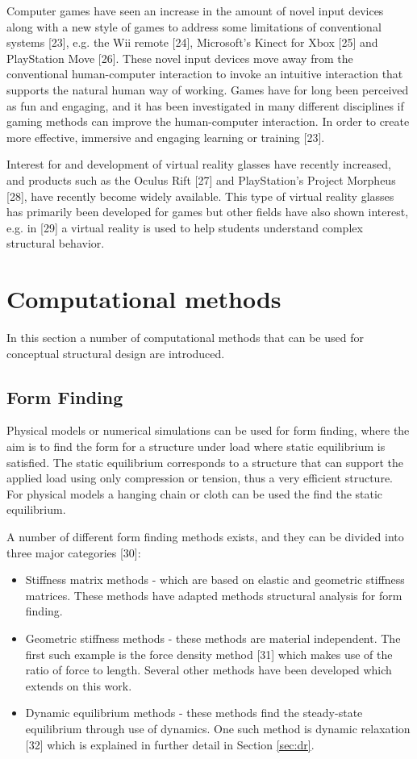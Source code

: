 Computer games have seen an increase in the amount of novel input devices along with a new style of games to address some limitations of conventional systems [23], e.g. the Wii remote [24], Microsoft’s Kinect for Xbox [25] and PlayStation Move [26]. These novel input devices move away from the conventional human-computer interaction to invoke an intuitive interaction that supports the natural human way of working. Games have for long been perceived as fun and engaging, and it has been investigated in many different disciplines if gaming methods can improve the human-computer interaction. In order to create more effective, immersive and engaging learning or training [23]. 

Interest for and development of virtual reality glasses have recently increased, and products such as the Oculus Rift [27] and PlayStation’s Project Morpheus [28], have recently become widely available. This type of virtual reality glasses has primarily been developed for games but other fields have also shown interest, e.g. in [29] a virtual reality is used to help students understand complex structural behavior.

\chapter{Computational methods}
\label{ch:Computational methods}
In this section a number of computational methods that can be used for conceptual structural design are introduced. 

\section{Form Finding}
Physical models or numerical simulations can be used for form finding, where the aim is to find the form for a structure under load where static equilibrium is satisfied. The static equilibrium corresponds to a structure that can support the applied load using only compression or tension, thus a very efficient structure. For physical models a hanging chain or cloth can be used the find the static equilibrium.

A number of different form finding methods exists, and they can be divided into three major categories [30]: 

\begin{itemize} 
\item Stiffness matrix methods - which are based on elastic and geometric stiffness matrices. These methods have adapted methods structural analysis for form finding.
\item Geometric stiffness methods - these methods are material independent. The first such example is the force density method [31] which makes use of the ratio of force to length. Several other methods have been developed which extends on this work.
\item Dynamic equilibrium methods - these methods find the steady-state equilibrium through use of dynamics. One such method is dynamic relaxation [32] which is explained in further detail in Section \ref{sec:dr}.
\end{itemize} 

